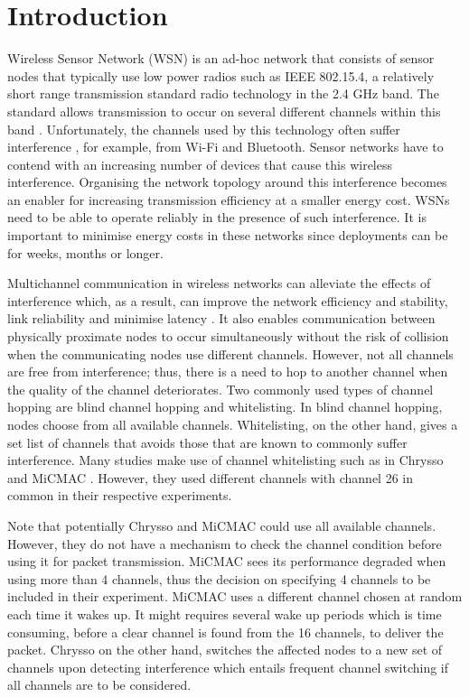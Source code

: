 \section{Introduction}
\label{sec:introduction}
Wireless Sensor Network (WSN) is an ad-hoc network that consists of sensor nodes that typically use low power radios such as IEEE 802.15.4, a relatively short range transmission standard radio technology in the 2.4 GHz band. The standard allows transmission to occur on several different channels within this band \cite{ieee802.15.4}. Unfortunately, the channels used by this technology often suffer interference \cite{Boano:2010:MSM:2127940.2127963, ieeeCompare}, for example, from Wi-Fi \cite{ieee_2012, wu} and Bluetooth. Sensor networks have to contend with an increasing number of devices that cause this wireless interference. Organising the network topology around this interference becomes an enabler for increasing transmission efficiency at a smaller energy cost. WSNs need to be able to operate reliably in the presence of such interference. It is important to minimise energy costs in these networks since deployments can be for weeks, months or longer.

Multichannel communication in wireless networks can alleviate the effects of interference which, as a result, can improve the network efficiency and stability, link reliability and minimise latency \cite{watteyne}. It also enables communication between physically proximate nodes to occur simultaneously without the risk of collision when the communicating nodes use different channels. However, not all channels are free from interference; thus, there is a need to hop to another channel when the quality of the channel deteriorates. Two commonly used types of channel hopping \cite{watteyne} are blind channel hopping and whitelisting. In blind channel hopping, nodes choose from all available channels. 
Whitelisting, on the other hand, gives a set list of channels that avoids those that are known to commonly suffer interference.
Many studies make use of channel whitelisting such as in Chrysso \cite{chrysso} and MiCMAC \cite{micmac}. However, they used different channels with channel 26 in common in their respective experiments. 

Note that potentially Chrysso and MiCMAC could use all available channels.
However, they do not have a mechanism to check the channel condition before using it for packet transmission. MiCMAC sees its performance degraded when using more than 4 channels, thus the decision on specifying 4 channels to be included in their experiment. 
MiCMAC uses a different channel chosen at random each time it wakes up.
It might requires several wake up periods which is time consuming, before a clear channel is found from the 16 channels, to deliver the packet.  
Chrysso on the other hand, switches the affected nodes to a new set of channels upon detecting interference which entails frequent channel switching if all channels are to be considered.

